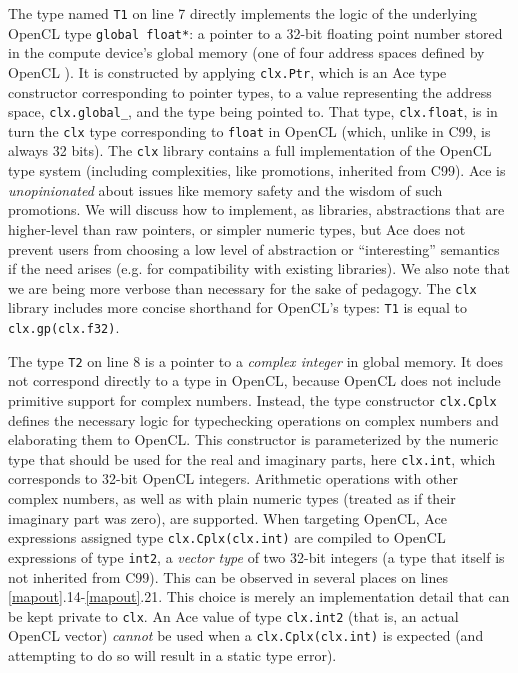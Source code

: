 The type named \verb|T1| on line 7 directly implements the logic of the underlying OpenCL type \verb|global float*|: a pointer to a 32-bit floating point number stored in the compute device's global memory (one of four address spaces defined by OpenCL \cite{opencl11}). It is constructed by applying \verb|clx.Ptr|, which is an Ace type constructor corresponding to pointer types, to a value representing the  address space, \verb|clx.global_|, and the type being pointed to. That type, \verb|clx.float|, is in turn the \verb|clx| type corresponding to \verb|float| in OpenCL (which, unlike in C99, is always 32 bits). 
The \verb|clx| library contains a full implementation of the OpenCL type system (including  complexities, like promotions, inherited from C99).
Ace is \emph{unopinionated} about issues like memory safety and the wisdom of such promotions. We will discuss how to implement, as libraries, abstractions that are higher-level than raw pointers, or simpler numeric types, but Ace does not prevent users from choosing a low level of abstraction or ``interesting'' semantics if the need arises (e.g. for compatibility with existing libraries). We also note that we are being more verbose than necessary for the sake of pedagogy. The \verb|clx| library includes more concise shorthand for OpenCL's types: \verb|T1| is equal to \verb|clx.gp(clx.f32)|. %

The type \verb|T2| on line 8 is a pointer to a \emph{complex integer} in global memory. It does not correspond directly to a type in OpenCL, because OpenCL does not include primitive support for complex numbers. Instead, the type constructor \verb|clx.Cplx| defines the necessary logic for typechecking operations on complex numbers and elaborating them to OpenCL. This constructor is parameterized by the numeric type that should be used for the real and imaginary parts, here \verb|clx.int|, which corresponds to 32-bit OpenCL integers. Arithmetic operations with other complex numbers, as well as with plain numeric types (treated as if their imaginary part was zero), are supported. When targeting OpenCL, Ace expressions assigned type \verb|clx.Cplx(clx.int)| are compiled to OpenCL expressions of type \verb|int2|, a  \emph{vector type} of two 32-bit integers (a type that itself is not inherited from C99). This can be observed in several places on lines \ref{mapout}.14-\ref{mapout}.21. This choice is merely an implementation detail that can be kept private to \verb|clx|. An Ace value of type \verb|clx.int2| (that is, an actual OpenCL vector) \emph{cannot} be used when a \verb|clx.Cplx(clx.int)| is expected (and attempting to do so will result in a static type error).

